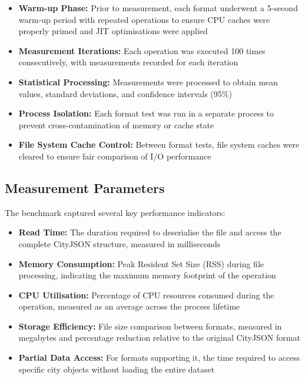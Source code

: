\begin{itemize}
  \item \textbf{Warm-up Phase:} Prior to measurement, each format underwent a 5-second warm-up period with repeated operations to ensure CPU caches were properly primed and JIT optimisations were applied

  \item \textbf{Measurement Iterations:} Each operation was executed 100 times consecutively, with measurements recorded for each iteration

  \item \textbf{Statistical Processing:} Measurements were processed to obtain mean values, standard deviations, and confidence intervals (95\%)

  \item \textbf{Process Isolation:} Each format test was run in a separate process to prevent cross-contamination of memory or cache state

  \item \textbf{File System Cache Control:} Between format tests, file system caches were cleared to ensure fair comparison of I/O performance
\end{itemize}

\subsection{Measurement Parameters}
\label{result:benchmark_on_local_environment:measurement_parameters}

The benchmark captured several key performance indicators:

\begin{itemize}
  \item \textbf{Read Time:} The duration required to deserialise the file and access the complete CityJSON structure, measured in milliseconds

  \item \textbf{Memory Consumption:} Peak Resident Set Size (RSS) during file processing, indicating the maximum memory footprint of the operation

  \item \textbf{CPU Utilisation:} Percentage of CPU resources consumed during the operation, measured as an average across the process lifetime

  \item \textbf{Storage Efficiency:} File size comparison between formats, measured in megabytes and percentage reduction relative to the original CityJSON format

  \item \textbf{Partial Data Access:} For formats supporting it, the time required to access specific city objects without loading the entire dataset
\end{itemize}

